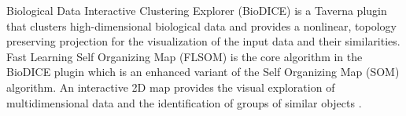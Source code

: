 Biological Data Interactive Clustering Explorer (BioDICE) is a Taverna plugin that clusters high-dimensional biological data and provides a nonlinear, topology preserving projection for the visualization of the input data and their similarities. Fast Learning Self Organizing Map (FLSOM) is the core algorithm in the BioDICE plugin which is an enhanced variant of the Self Organizing Map (SOM) algorithm. An interactive 2D map provides the visual exploration of multidimensional data and the identification of groups of similar objects \cite{2010}. 